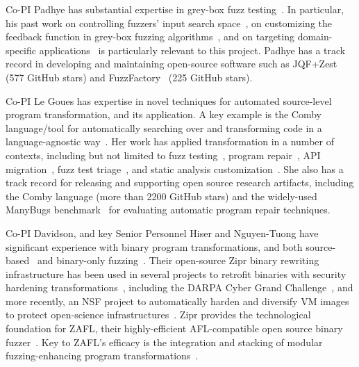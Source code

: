 Co-PI Padhye has substantial expertise in grey-box fuzz testing~\cite{perffuzz,
jqf, zest, fuzzfactory, rlcheck, bigfuzz, bonsai, naturalfuzz, mu2}. In
particular, his past work on controlling fuzzers' input search space~\cite{jqf,
zest}, on customizing the feedback function in grey-box fuzzing
algorithms~\cite{perffuzz, fuzzfactory, bonsai, mu2}, and on targeting
domain-specific applications~\cite{partemu, bigfuzz, naturalfuzz} is
particularly relevant to this project. Padhye has a track record in developing
and maintaining open-source software such as JQF+Zest~\cite{jqf-github} (577
GitHub stars) and FuzzFactory~\cite{fuzzfactory} (225 GitHub stars).

Co-PI Le Goues has expertise in novel techniques for automated
source-level program transformation, and its application.  A key example is the
Comby language/tool for automatically searching over and transforming code in a
language-agnostic way~\cite{rvt-ppc,comby-github}.  Her work has applied transformation in a number of
contexts, including but not limited to fuzz testing~\cite{cc2022}, 
program repair~\cite{wong21varfix,legouesNFWTSE2012,footpatch}, API migration~\cite{ni21soar}, fuzz test
triage~\cite{vantonder-ase18}, and static analysis customization~\cite{vanTonder-tailoring20}.  She
also has a track record for releasing and supporting open source research
artifacts, including the Comby language (more than 2200 GitHub stars) and the
widely-used ManyBugs benchmark~\cite{legoues15tse} for evaluating automatic program
repair techniques.

Co-PI Davidson, and key Senior Personnel Hiser and Nguyen-Tuong have significant
experience with binary program transformations, and both source-based~\cite{ahmed2021bigmap} and binary-only fuzzing~\cite{nagy2021breaking,nagy2021same}.
Their open-source Zipr binary rewriting infrastructure has been used in several
projects to retrofit binaries with security hardening transformations~\cite{zipr,hawkins2017zipr,hawkins2017securing,hiser2017zipr++,schulte2022broad}, including
the DARPA Cyber Grand Challenge~\cite{nguyen2018xandra}, and more recently, an NSF project to automatically harden and diversify VM images
to protect open-science infrastructures~\cite{davidson2023helix++}. 
Zipr provides the technological foundation for ZAFL, their highly-efficient AFL-compatible open source binary fuzzer~\cite{zafl}.
Key to ZAFL's efficacy is the integration and stacking of modular fuzzing-enhancing program transformations~\cite{nagy2021breaking,nagy2021same}.

